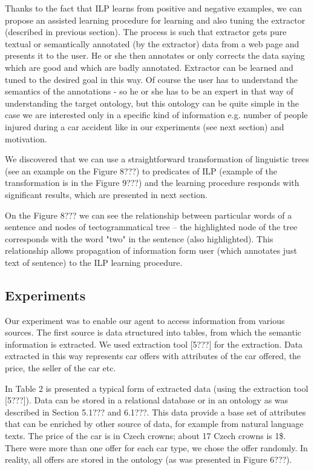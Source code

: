 \documentclass{sig-alternate}
\begin{document}
Thanks to the fact that ILP learns from positive and negative examples, we can propose an assisted learning procedure for learning and also tuning the extractor (described in previous section). The process is such that extractor gets pure textual or semantically annotated (by the extractor) data from a web page and presents it to the user. He or she then annotates or only corrects the data saying which are good and which are badly annotated. Extractor can be learned and tuned to the desired goal in this way. Of course the user has to understand the semantics of the annotations - so he or she has to be an expert in that way of understanding the target ontology, but this ontology can be quite simple in the case we are interested only in a specific kind of information e.g. number of people injured during a car accident like in our experiments (see next section) and motivation. 

We discovered that we can use a straightforward transformation of linguistic trees (see an example on the Figure 8???) to predicates of ILP (example of the transformation is in the Figure 9???) and the learning procedure responds with significant results, which are presented in next section.

On the Figure 8??? we can see the relationship between particular words of a sentence and nodes of tectogrammatical tree -- the highlighted node of the tree corresponds with the word "two" in the sentence (also highlighted). This relationship allows propagation of information form user (which annotates just text of sentence) to the ILP learning procedure.


\subsection{Experiments}
Our experiment was to enable our agent to access information from various sources. The first source is data structured into tables, from which the semantic information is extracted. We used extraction tool [5???] for the extraction. Data extracted in this way represents car offers with attributes of the car offered, the price, the seller of the car etc.

In Table 2 is presented a typical form of extracted data (using the extraction tool [5???]). Data can be stored in a relational database or in an ontology as was described in Section 5.1??? and 6.1???. This data provide a base set of attributes that can be enriched by other source of data, for example from natural language texts.
The price of the car is in Czech crowns; about 17 Czech crowns is 1\$. There were more than one offer for each car type, we chose the offer randomly. In reality, all offers are stored in the ontology (as was presented in Figure 6???).
\end{document}
